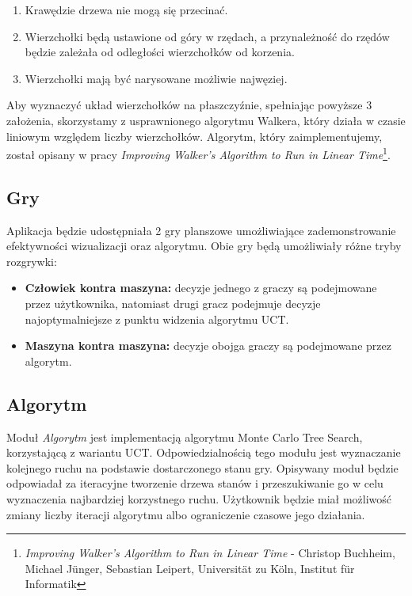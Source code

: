 \documentclass{article}
\newcommand{\modulename}[1]{\textit{#1}}
\begin{document}
	\begin{enumerate}
		\item Krawędzie drzewa nie mogą się przecinać.
		\item Wierzchołki będą ustawione od góry w rzędach, a przynależność do
		rzędów będzie zależała od odległości wierzchołków od korzenia.
		\item Wierzchołki mają być narysowane możliwie najwęziej.  \\
	\end{enumerate}

	\noindent Aby wyznaczyć układ wierzchołków na płaszczyźnie, spełniając powyższe 3 założenia, skorzystamy z usprawnionego algorytmu Walkera, który działa w czasie liniowym względem liczby wierzchołków. Algorytm, który zaimplementujemy, został opisany w pracy \textit{Improving Walker's Algorithm to Run in Linear Time}\footnote{\modulename{Improving Walker's Algorithm to Run in Linear Time} - Christop Buchheim, Michael Jünger, Sebastian Leipert, Universität zu Köln, Institut für Informatik}.
	
	\subsection{Gry}
	Aplikacja będzie udostępniała 2 gry planszowe umożliwiające zademonstrowanie efektywności wizualizacji oraz algorytmu. Obie gry będą umożliwiały różne tryby rozgrywki: \\
	
	\begin{itemize}
		\item \textbf{Człowiek kontra maszyna:} decyzje jednego z graczy są podejmowane przez użytkownika, natomiast drugi gracz podejmuje decyzje najoptymalniejsze z punktu widzenia algorytmu UCT.
		\item \textbf{Maszyna kontra maszyna:} decyzje obojga graczy są podejmowane przez algorytm. 
	\end{itemize}
	
	
	\subsection{Algorytm}
	Moduł \modulename{Algorytm} jest implementacją algorytmu Monte Carlo Tree Search, korzystającą z wariantu UCT. Odpowiedzialnością tego modułu jest wyznaczanie kolejnego ruchu na podstawie dostarczonego stanu gry. Opisywany moduł będzie odpowiadał za iteracyjne tworzenie drzewa stanów i przeszukiwanie go w celu wyznaczenia najbardziej korzystnego ruchu. Użytkownik będzie miał możliwość zmiany liczby iteracji algorytmu albo ograniczenie czasowe jego działania. \\
	
\end{document}
